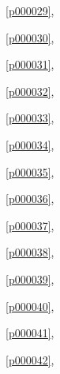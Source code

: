 \noindent\figurename\ \ref{p000029},\ \pageref{p000029}

\noindent\figurename\ \ref{p000030},\ \pageref{p000030}

\noindent\figurename\ \ref{p000031},\ \pageref{p000031}

\noindent\figurename\ \ref{p000032},\ \pageref{p000032}

\noindent\figurename\ \ref{p000033},\ \pageref{p000033}

\noindent\figurename\ \ref{p000034},\ \pageref{p000034}

\noindent\figurename\ \ref{p000035},\ \pageref{p000035}

\noindent\figurename\ \ref{p000036},\ \pageref{p000036}

\noindent\figurename\ \ref{p000037},\ \pageref{p000037}

\noindent\figurename\ \ref{p000038},\ \pageref{p000038}

\noindent\figurename\ \ref{p000039},\ \pageref{p000039}

\noindent\figurename\ \ref{p000040},\ \pageref{p000040}

\noindent\figurename\ \ref{p000041},\ \pageref{p000041}

\noindent\figurename\ \ref{p000042},\ \pageref{p000042}









